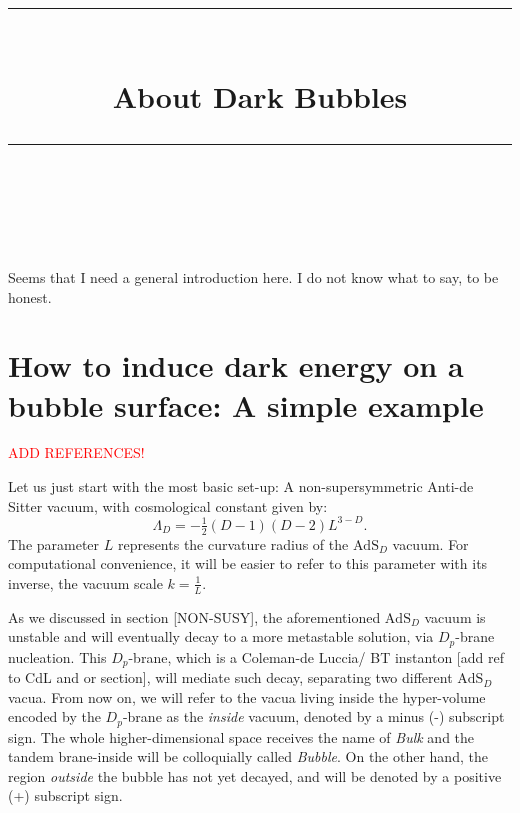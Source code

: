 \documentclass[12pt, a4paper]{article} %
\title{	
	\normalfont\normalsize
	\textsc{}\\ %
	\vspace{5pt} %
	\rule{\linewidth}{0.2pt}\\ %
	\vspace{10pt} %
	{\huge About Dark Bubbles}\\ %
	\vspace{5pt} %
	\rule{\linewidth}{-2pt}\\ %
	\vspace{-25pt} %
	\date{}
}
\author{}
\begin{document}
\maketitle 
\tableofcontents




\newpage

Seems that I need a general introduction here. I do not know what to say, to be honest.
\section{How to induce dark energy on a bubble surface: A simple example}\label{sec: simple_example}

\textcolor{red}{ADD REFERENCES!}

Let us just start with the most basic set-up: A non-supersymmetric Anti-de Sitter vacuum, with cosmological constant given by:
\begin{equation}
	\Lambda_{D} = - \tfrac{1}{2}(D-1)(D-2)L^{3-D}.
\end{equation}
The parameter $L$ represents the curvature radius of the $\text{AdS}_{D}$ vacuum. For computational convenience, it will be easier to refer to this parameter with its inverse, the vacuum scale $k = \tfrac{1}{L}$.

As we discussed in section [NON-SUSY], the aforementioned $\text{AdS}_{D}$ vacuum is unstable and will eventually decay to a more metastable solution, via $D_{p}$-brane nucleation. This $D_{p}$-brane, which is a Coleman-de Luccia/ BT instanton [add ref to CdL and or section], will mediate such decay, separating two different $\text{AdS}_{D}$ vacua. From now on, we will refer to the vacua living inside the hyper-volume encoded by the $D_{p}$-brane as the \textit{inside} vacuum, denoted by a minus (-) subscript sign. The whole higher-dimensional space receives the name of \textit{Bulk} and the tandem brane-inside will be colloquially called \textit{Bubble}. On the other hand, the region \textit{outside} the bubble has not yet decayed, and will be denoted by a positive (+) subscript sign.

%	  
\end{document}
